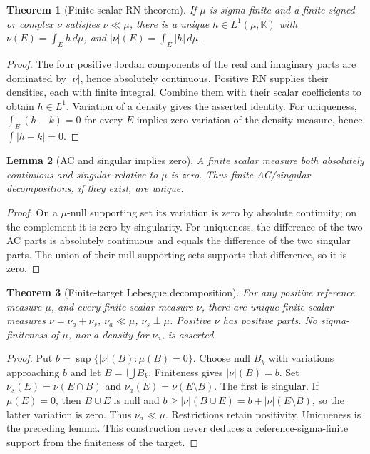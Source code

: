 \documentclass[11pt,oneside,openany]{book}
\newtheorem{theorem}{Theorem}[chapter]
\newtheorem{lemma}[theorem]{Lemma}
\theoremstyle{definition}
\theoremstyle{remark}
\newcommand{\family}[1]{}
\begin{document}
\begin{theorem}[Finite scalar RN theorem]\family{D11.15.rn_signed_complex}\label{d11:15:rn-signed-complex}
If $\mu$ is sigma-finite and a finite signed or complex $\nu$ satisfies
$\nu\ll\mu$, there is a unique $h\in L^1(\mu,\mathbb K)$ with
$\nu(E)=\int_Eh\,d\mu$, and $|\nu|(E)=\int_E|h|\,d\mu$.
\end{theorem}
\begin{proof}
The four positive Jordan components of the real and imaginary parts are
dominated by $|\nu|$, hence absolutely continuous. Positive RN supplies
their densities, each with finite integral. Combine them with their scalar
coefficients to obtain $h\in L^1$. Variation of a density gives the asserted
identity. For uniqueness, $\int_E(h-k)=0$ for every $E$ implies zero
variation of the density measure, hence $\int|h-k|=0$.
\end{proof}

\begin{lemma}[AC and singular implies zero]\family{D11.15.ac_singular_zero}\label{d11:15:ac-singular-zero}
A finite scalar measure both absolutely continuous and singular relative to
$\mu$ is zero. Thus finite AC/singular decompositions, if they exist, are
unique.
\end{lemma}
\begin{proof}
On a $\mu$-null supporting set its variation is zero by absolute continuity;
on the complement it is zero by singularity. For uniqueness, the difference
of the two AC parts is absolutely continuous and equals the difference of
the two singular parts. The union of their null supporting sets supports
that difference, so it is zero.
\end{proof}

\begin{theorem}[Finite-target Lebesgue decomposition]\family{D11.15.lebesgue_decomposition_finite_target}\label{d11:15:lebesgue-decomposition-finite-target}
For any positive reference measure $\mu$, and every finite scalar measure
$\nu$, there are unique finite scalar measures
$\nu=\nu_a+\nu_s$, $\nu_a\ll\mu$, $\nu_s\perp\mu$.
Positive $\nu$ has positive parts. No sigma-finiteness of $\mu$, nor a
density for $\nu_a$, is asserted.
\end{theorem}
\begin{proof}
Put $b=\sup\{|\nu|(B):\mu(B)=0\}$. Choose null $B_k$ with variations
approaching $b$ and let $B=\bigcup B_k$. Finiteness gives
$|\nu|(B)=b$. Set $\nu_s(E)=\nu(E\cap B)$ and
$\nu_a(E)=\nu(E\setminus B)$. The first is singular. If $\mu(E)=0$,
then $B\cup E$ is null and
$b\geq|\nu|(B\cup E)=b+|\nu|(E\setminus B)$, so the latter variation
is zero. Thus $\nu_a\ll\mu$. Restrictions retain positivity.
Uniqueness is the preceding lemma. This construction never deduces a
reference-sigma-finite support from the finiteness of the target.
\end{proof}
\end{document}
